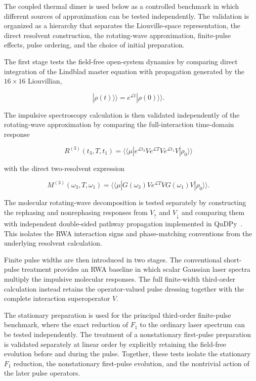\documentclass[11pt]{article}
\begin{document}
The coupled thermal dimer is used below as a controlled benchmark in
which different sources of approximation can be tested independently.
The validation is organized as a hierarchy that separates the
Liouville-space representation, the direct resolvent construction, the
rotating-wave approximation, finite-pulse effects, pulse ordering, and
the choice of initial preparation.

The first stage tests the field-free open-system dynamics by comparing
direct integration of the Lindblad master equation with propagation
generated by the $16\times16$ Liouvillian,

\begin{equation}
|\rho(t)\rangle\rangle
=
e^{\mathcal{L}t}
|\rho(0)\rangle\rangle.
\end{equation}

The impulsive spectroscopy calculation is then validated independently
of the rotating-wave approximation by comparing the full-interaction
time-domain response

\begin{equation}
R^{(3)}(t_3,T,t_1)
=
\langle\!\langle\mu|
e^{\mathcal{L}t_3}
V
e^{\mathcal{L}T}
V
e^{\mathcal{L}t_1}
V
|\rho_0\rangle\rangle
\end{equation}

with the direct two-resolvent expression

\begin{equation}
M^{(3)}(\omega_3,T,\omega_1)
=
\langle\!\langle\mu|
G(\omega_3)
V
e^{\mathcal{L}T}
V
G(\omega_1)
V
|\rho_0\rangle\rangle.
\end{equation}

The molecular rotating-wave decomposition is tested separately by
constructing the rephasing and nonrephasing responses from
$V_{\uparrow}$ and $V_{\downarrow}$ and comparing them with
independent double-sided pathway propagation implemented in
QuDPy~\cite{shah2023qudpy}. This isolates the RWA interaction signs and
phase-matching conventions from the underlying resolvent calculation.

Finite pulse widths are then introduced in two stages. The
conventional short-pulse treatment provides an RWA baseline in which
scalar Gaussian laser spectra multiply the impulsive molecular
responses. The full finite-width third-order calculation instead
retains the operator-valued pulse dressing together with the complete
interaction superoperator $V$.

The stationary preparation is used for the principal third-order
finite-pulse benchmark, where the exact reduction of $F_1$ to the
ordinary laser spectrum can be tested independently. The treatment of
a nonstationary first-pulse preparation is validated separately at
linear order by explicitly retaining the field-free evolution before
and during the pulse. Together, these tests isolate the stationary
$F_1$ reduction, the nonstationary first-pulse evolution, and the
nontrivial action of the later pulse operators.
\end{document}
